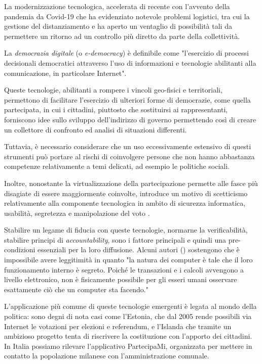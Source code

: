\documentclass[12pt,a4paper,openright,twoside]{book}
\begin{document}
La modernizzazione tecnologica, accelerata di recente con l'avvento della pandemia da Covid-19 che ha evidenziato notevole problemi
logistici, tra cui la gestione del distanziamento \cite{sotoacosta} e ha aperto un ventaglio di possibilità tali da
permettere un ritorno ad un controllo più diretto da parte della collettività.

La \textit{democrazia digitale} (o \textit{e-democracy}) è definibile come "l'esercizio di processi decisionali democratici attraverso 
l'uso di informazioni e tecnologie abilitanti alla comunicazione, in particolare Internet"\cite{rotzocki}.

Queste tecnologie, abilitanti a rompere i vincoli geo-fisici e territoriali,
permettono di facilitare l'esercizio di ulteriori forme di democrazie,
come quella partecipata, in cui i cittadini, piuttosto che
sostituirsi ai rappresentanti, forniscono idee sullo sviluppo dell'indirizzo di governo
permettendo così di creare un collettore di confronto ed analisi di situazioni differenti.

Tuttavia, è necessario considerare che un uso eccessivamente estensivo di questi strumenti
può portare al rischi di coinvolgere persone che non hanno abbastanza competenze relativamente 
a temi delicati, ad esempio le politiche sociali. 

Inoltre, nonostante la virtualizzazione della partecipazione permette alle fasce più disagiate di essere
maggiormente coinvolte, introduce un motivo di scetticismo relativamente alla componente tecnologica
in ambito di sicurezza informatica, usabilità, segretezza e manipolazione del voto \cite{aichholzer2020experience}.

Stabilire un legame di fiducia con queste tecnologie, normarne la verificabilità, stabilire principi di 
\textit{accountability}, sono i fattore principali e quindi una pre-condizioni essenziali
per la loro diffusione. 
Alcuni autori (\cite{mcgaley}) sostengono che è impossibile avere leggitimità in quanto "la natura dei computer è tale che il loro funzionamento interno è segreto.
Poiché le transazioni e i calcoli avvengono a livello elettronico, 
non è fisicamente possibile per gli esseri umani osservare esattamente ciò che un computer sta facendo."

L'applicazione più comune di queste tecnologie emergenti è legata al mondo della politica\cite{aichholzer2020experience}:
sono degni di nota casi come l'Estonia, che dal 2005 rende possibili via Internet le votazioni
per elezioni e referendum, e l'Islanda che tramite un ambizioso progetto tenta di riscrivere 
la costituzione con l'apporto dei cittadini. In Italia possiamo rilevare l'applicativo PartecipaMi,
organizzata per mettere in contatto la popolazione milanese con l'amministrazione comunale.\cite{WebsitePartecipaMi}
\end{document}
